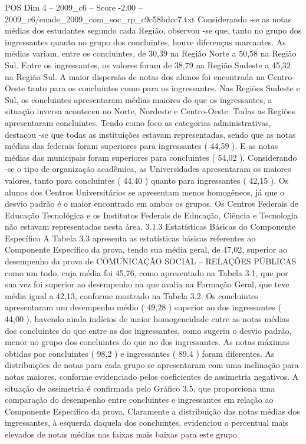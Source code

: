\begin{textsample}{POS Dim 4 – 2009\_c6 – Score -2.00 – 2009\_c6/enade\_2009\_com\_soc\_rp\_c9c58bdcc7.txt}
Considerando -se as notas médias dos estudantes segundo cada Região, observou -se que, tanto no grupo dos ingressantes quanto no grupo dos concluintes, houve diferenças marcantes.
As médias variam, entre os concluintes, de 30,39 na Região Norte a 50,58 na Região Sul.
Entre os ingressantes, os valores foram de 38,79 na Região Sudeste a 45,32 na Região Sul.
A maior dispersão de notas dos alunos foi encontrada na Centro-Oeste tanto para os concluintes como para os ingressantes.
Nas Regiões Sudeste e Sul, os concluintes apresentaram médias maiores do que os ingressantes, a situação inversa aconteceu no Norte, Nordeste e Centro-Oeste.
Todas as Regiões apresentaram concluintes.
Tendo como foco as categorias administrativas, destacou -se que todas as instituições estavam representadas, sendo que as notas médias das federais foram superiores para ingressantes ( 44,59 ).
E as notas médias das municipais foram superiores para concluintes ( 54,02 ).
Considerando -se o tipo de organização acadêmica, as Universidades apresentaram os maiores valores, tanto para concluintes ( 44,40 ) quanto para ingressantes ( 42,15 ).
Os alunos dos Centros Universitários se apresentam menos homogêneos, já que o desvio padrão é o maior encontrado em ambos os grupos.
Os Centros Federais de Educação Tecnológica e os Institutos Federais de Educação, Ciência e Tecnologia não estavam representadas nesta área. 3.1.3 Estatísticas Básicas do Componente Específico A Tabela 3.3 apresenta as estatísticas básicas referentes ao Componente Específico da prova, tendo sua média geral, de 47,02, superior ao desempenho da prova de COMUNICAÇÃO SOCIAL – RELAÇÕES PÚBLICAS como um todo, cuja média foi 45,76, como apresentado na Tabela 3.1, que por sua vez foi superior ao desempenho na que avalia na Formação Geral, que teve média igual a 42,13, conforme mostrado na Tabela 3.2.
Os concluintes apresentaram um desempenho médio ( 49,28 ) superior ao dos ingressantes ( 44,00 ), havendo ainda indícios de maior homogeneidade entre as notas médias dos concluintes do que entre as dos ingressantes, como sugeriu o desvio padrão, menor no grupo dos concluintes do que no dos ingressantes.
As notas máximas obtidas por concluintes ( 98,2 ) e ingressantes ( 89,4 ) foram diferentes.
As distribuições de notas para cada grupo se apresentaram com uma inclinação para notas maiores, conforme evidenciado pelos coeficientes de assimetria negativos.
A situação de assimetria é confirmada pelo Gráfico 3.5, que proporciona uma comparação do desempenho entre concluintes e ingressantes em relação ao Componente Específico da prova.
Claramente a distribuição das notas médias dos ingressantes, à esquerda daquela dos concluintes, evidenciou o percentual mais elevados de notas médias nas faixas mais baixas para este grupo.

\end{textsample}
